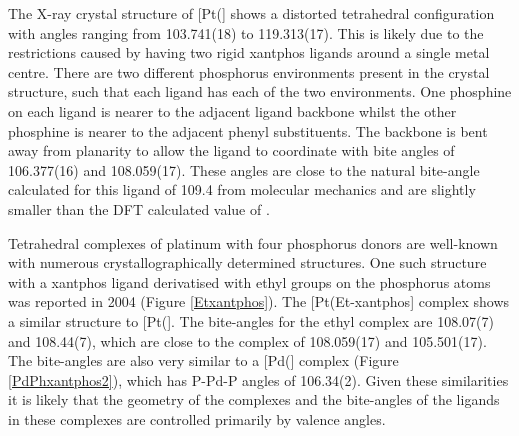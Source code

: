 The X-ray crystal structure of [Pt(\Phthixantphos{}] shows a distorted tetrahedral configuration with angles ranging from 103.741(18) to 119.313(17)\degrees.  This is likely due to the restrictions caused by having two rigid xantphos ligands around a single metal centre.  There are two different phosphorus environments present in the crystal structure, such that each ligand has each of the two environments.  One phosphine on each ligand is nearer to the adjacent ligand backbone whilst the other phosphine is nearer to the adjacent phenyl substituents.  The backbone is bent away from planarity to allow the ligand to coordinate with bite angles of 106.377(16) and 108.059(17)\degrees. These angles are close to the natural bite-angle calculated for this ligand of 109.4\degrees{} from molecular mechanics and are slightly smaller than the DFT calculated value of \fixme{112.64\degrees}.\cite{Birkholz2009}

Tetrahedral complexes of platinum with four phosphorus donors are well-known with numerous crystallographically determined structures.\cite{Allen2002}  One such structure with a xantphos ligand derivatised with ethyl groups on the phosphorus atoms was reported in 2004 (Figure \ref{Etxantphos}).\cite{Miedaner2004}  The [Pt(Et-xantphos] complex shows a similar structure to [Pt(\Phthixantphos{}].  The bite-angles for the ethyl complex are 108.07(7) and 108.44(7)\degrees, which are close to the \Phthixantphos{} complex of 108.059(17) and 105.501(17)\degrees.  The bite-angles are also very similar to a [Pd(\Phxantphos{}] complex (Figure \ref{PdPhxantphos2}), which has P-Pd-P angles of 106.34(2)\degrees{}.\cite{Grushin2006} Given these similarities it is likely that the geometry of the complexes and the bite-angles of the ligands in these complexes are controlled primarily by valence angles. 



